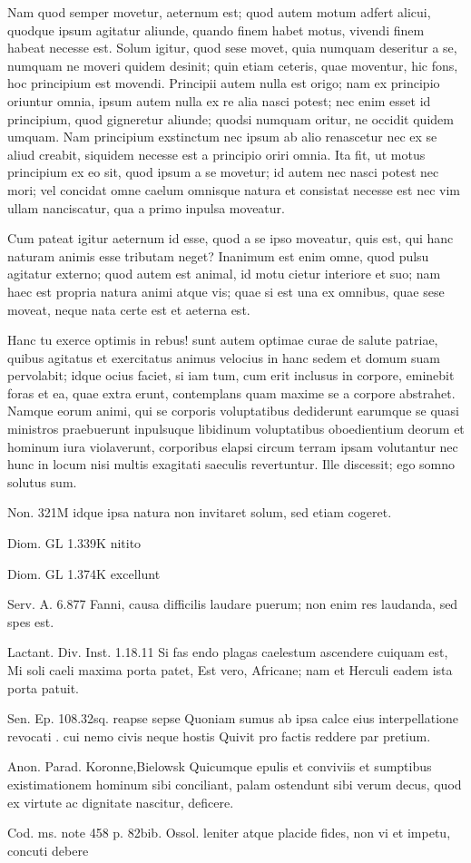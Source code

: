  Nam quod semper movetur, aeternum est; quod autem motum adfert alicui, quodque ipsum agitatur aliunde, quando finem habet motus, vivendi finem habeat necesse est. Solum igitur, quod sese movet, quia numquam deseritur a se, numquam ne moveri quidem desinit; quin etiam ceteris, quae moventur, hic fons, hoc principium est movendi. Principii autem nulla est origo; nam ex principio oriuntur omnia, ipsum autem nulla ex re alia nasci potest; nec enim esset id principium, quod gigneretur aliunde; quodsi numquam oritur, ne occidit quidem umquam. Nam principium exstinctum nec ipsum ab alio renascetur nec ex se aliud creabit, siquidem necesse est a principio oriri omnia. Ita fit, ut motus principium ex eo sit, quod ipsum a se movetur; id autem nec nasci potest nec mori; vel concidat omne caelum omnisque natura et consistat necesse est nec vim ullam nanciscatur, qua a primo inpulsa moveatur.

 Cum pateat igitur aeternum id esse, quod a se ipso moveatur, quis est, qui hanc naturam animis esse tributam neget? Inanimum est enim omne, quod pulsu agitatur externo; quod autem est animal, id motu cietur interiore et suo; nam haec est propria natura animi atque vis; quae si est una ex omnibus, quae sese moveat, neque nata certe est et aeterna est.

 Hanc tu exerce optimis in rebus! sunt autem optimae curae de salute patriae, quibus agitatus et exercitatus animus velocius in hanc sedem et domum suam pervolabit; idque ocius faciet, si iam tum, cum erit inclusus in corpore, eminebit foras et ea, quae extra erunt, contemplans quam maxime se a corpore abstrahet. Namque eorum animi, qui se corporis voluptatibus dediderunt earumque se quasi ministros praebuerunt inpulsuque libidinum voluptatibus oboedientium deorum et hominum iura violaverunt, corporibus elapsi circum terram ipsam volutantur nec hunc in locum nisi multis exagitati saeculis revertuntur. Ille discessit; ego somno solutus sum.

 Non. 321M idque ipsa natura non invitaret solum, sed etiam cogeret.

 Diom. GL 1.339K nitito

 Diom. GL 1.374K excellunt

 Serv. A. 6.877 Fanni, causa difficilis laudare puerum; non enim res laudanda, sed spes est.

 Lactant. Div. Inst. 1.18.11 Si fas endo plagas caelestum ascendere cuiquam est, Mi soli caeli maxima porta patet, Est vero, Africane; nam et Herculi eadem ista porta patuit.

 Sen. Ep. 108.32sq. reapse sepse Quoniam sumus ab ipsa calce eius interpellatione revocati . cui nemo civis neque hostis Quivit pro factis reddere par pretium.

 Anon. Parad. Koronne,Bielowsk Quicumque epulis et conviviis et sumptibus existimationem hominum sibi conciliant, palam ostendunt sibi verum decus, quod ex virtute ac dignitate nascitur, deficere.

 Cod. ms. note 458 p. 82bib. Ossol. leniter atque placide fides, non vi et impetu, concuti debere

